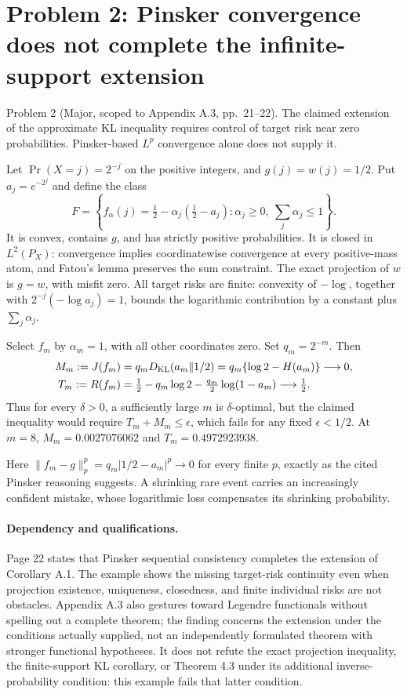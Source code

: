 \documentclass[10pt]{article}
\begin{document}
\section*{Problem 2: Pinsker convergence does not complete the infinite-support extension}
Problem 2 (Major, scoped to Appendix A.3, pp. 21–22).  The claimed extension of the approximate KL inequality requires control of target risk near zero probabilities. Pinsker-based \(L^p\) convergence alone does not supply it.\par
Let \(\Pr(X=j)=2^{-j}\) on the positive integers, and \(g(j)=w(j)=1/2\). Put \(a_j=e^{-2^j}\) and define the class \[F=\left\{f_\alpha(j)=\tfrac12-\alpha_j(\tfrac12-a_j):
       \alpha_j\geq0,\ \sum_j\alpha_j\leq1\right\}.\] It is convex, contains \(g\), and has strictly positive probabilities. It is closed in \(L^2(P_X)\): convergence implies coordinatewise convergence at every positive-mass atom, and Fatou’s lemma preserves the sum constraint. The exact projection of \(w\) is \(g=w\), with misfit zero. All target risks are finite: convexity of \(-\log\), together with \(2^{-j}(-\log a_j)=1\), bounds the logarithmic contribution by a constant plus \(\sum_j\alpha_j\).\par
Select \(f_m\) by \(\alpha_m=1\), with all other coordinates zero. Set \(q_m=2^{-m}\). Then \[\begin{aligned}
 M_m:=J(f_m)
   &=q_mD_{\rm KL}(a_m\|1/2)
     =q_m\{\log2-H(a_m)\}\longrightarrow0,\\
 T_m:=R(f_m)
   &=\tfrac12-q_m\log2-\tfrac{q_m}{2}\log(1-a_m)
     \longrightarrow\tfrac12.\end{aligned}\] Thus for every \(\delta>0\), a sufficiently large \(m\) is \(\delta\)-optimal, but the claimed inequality would require \(T_m+M_m\leq\epsilon\), which fails for any fixed \(\epsilon<1/2\). At \(m=8\), \(M_m=0.0027076062\) and \(T_m=0.4972923938\).\par
Here \(\|f_m-g\|_p^p=q_m|1/2-a_m|^p\to0\) for every finite \(p\), exactly as the cited Pinsker reasoning suggests. A shrinking rare event carries an increasingly confident mistake, whose logarithmic loss compensates its shrinking probability.\par
\paragraph*{Dependency and qualifications.}\mbox{}\par
Page 22 states that Pinsker sequential consistency completes the extension of Corollary A.1. The example shows the missing target-risk continuity even when projection existence, uniqueness, closedness, and finite individual risks are not obstacles. Appendix A.3 also gestures toward Legendre functionals without spelling out a complete theorem; the finding concerns the extension under the conditions actually supplied, not an independently formulated theorem with stronger functional hypotheses. It does not refute the exact projection inequality, the finite-support KL corollary, or Theorem 4.3 under its additional inverse-probability condition: this example fails that latter condition.\par
\end{document}
